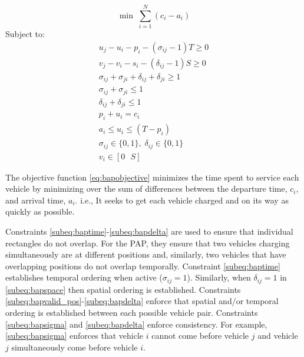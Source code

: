 \documentclass[utf8]{FrontiersinHarvard}
\begin{document}
\begin{equation}
	\label{eq:bapobjective}
	\min\; \sum_{i=1}^N (c_i - a_i)
\end{equation}
Subject to:
\begin{subequations}
\label{eq:bapconstrs}
\begin{align}
    u_j - u_i - p_i - (\sigma_{ij} - 1)T \geq 0                  \label{subeq:baptime}          \\
    v_j - v_i - s_i - (\delta_{ij} - 1)S \geq 0                  \label{subeq:bapspace}         \\
    \sigma_{ij} + \sigma_{ji} + \delta_{ij} + \delta_{ji} \geq 1 \label{subeq:bapvalid_pos}     \\
    \sigma_{ij} + \sigma_{ji} \leq 1                              \label{subeq:bapsigma}        \\
    \delta_{ij} + \delta_{ji} \leq 1                              \label{subeq:bapdelta}        \\
    p_i + u_i = c_i                                               \label{subeq:bapdetach}       \\
    a_i \leq u_i \leq (T - p_i)                                   \label{subeq:bapvalid_starts} \\
    \sigma_{ij} \in \{0,1\},\;\delta_{ij} \in \{0,1\}\;           \label{subeq:bapsdspace}      \\
    v_i \in [0 \mbox{ } S ]                                       \label{subeq:bapvspace}
\end{align}
\end{subequations}

\noindent

The objective function \eqref{eq:bapobjective} minimizes the time spent to service each vehicle by minimizing over the
sum of differences between the departure time, $c_i$, and arrival time, $a_i$. i.e., It seeks to get each vehicle
charged and on its way as quickly as possible.

Constraints \ref{subeq:baptime}-\ref{subeq:bapdelta} are used to ensure that individual rectangles do not overlap. For
the PAP, they ensure that two vehicles charging simultaneously are at different positions and, similarly, two vehicles
that have overlapping positions do not overlap temporally. Constraint \eqref{subeq:baptime} establishes temporal
ordering when active ($\sigma_{ij}=1$). Similarly, when $\delta_{ij} =1$ in \eqref{subeq:bapspace} then spatial ordering is
established. Constraints \ref{subeq:bapvalid_pos}-\ref{subeq:bapdelta} enforce that spatial and/or temporal ordering is
established between each possible vehicle pair. Constraints \eqref{subeq:bapsigma} and \eqref{subeq:bapdelta} enforce
consistency. For example, \eqref{subeq:bapsigma} enforces that vehicle $i$ cannot come before vehicle $j$ and vehicle
$j$ simultaneously come before vehicle $i$.
\end{document}
